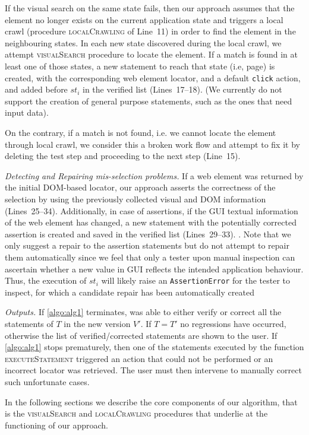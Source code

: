 If the visual search on the same state fails, then our approach assumes that the element no longer exists on the current application state and triggers a local crawl (procedure \textsc{localCrawling} of Line~11) in order to find the element in the neighbouring states. In each new state discovered during the local crawl, we attempt \textsc{visualSearch} procedure to locate the element. If a match is found in at least one of those states, a new statement to reach that state (i.e, page) is created, with the corresponding web element locator, and a default \texttt{click} action, and added before $st_i$ in the verified list (Lines~17--18). (We currently do not support the creation of general purpose statements, such as the ones that need input data).

On the contrary, if a match is not found, i.e. we cannot locate the element through local crawl, we consider this a broken work flow and attempt to fix it by deleting the test step and proceeding to the next step (Line~15).

\textit{Detecting and Repairing mis-selection problems.}
If a web element was returned by the initial DOM-based locator, our approach asserts the correctness of the selection by using the previously collected visual and DOM information (Lines~25--34). Additionally, in case of assertions, if the GUI textual information of the web element has changed, a new statement with the potentially corrected assertion is created and saved in the verified list (Lines~29--33). .
Note that we only suggest a repair to the assertion statements but do not attempt to repair them automatically since we feel that only a tester upon manual inspection can ascertain whether a new value in GUI reflects the intended application behaviour.
Thus, the execution of $st_i$ will likely raise an \texttt{AssertionError} for the tester to inspect, for which a candidate repair has been automatically created

\textit{Outputs.}
If \autoref{algo:alg1} terminates, \tool was able to either verify or correct all the statements of $T$ in the new version $V'$. If $T = T'$ no regressions have occurred, otherwise the list of verified/corrected statements are shown to the user.
If \autoref{algo:alg1} stops prematurely, then one of the statements executed by the function \textsc{executeStatement} triggered an action that could not be performed or an incorrect locator was retrieved. The user must then intervene to manually correct such unfortunate cases.

In the following sections we describe the core components of our algorithm, that is the \textsc{visualSearch} and \textsc{localCrawling} procedures that underlie at the functioning of our approach.

